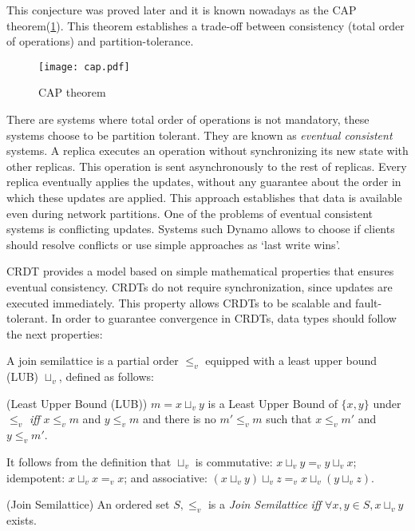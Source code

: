 This conjecture was proved\cite{capproof} later and it is known nowadays as the CAP
theorem(\ref{fig:cap}). This theorem establishes a trade-off between consistency (total order
of operations) and partition-tolerance.

\begin{figure}[!h]
  \centering
  \texttt{[image: cap.pdf]}
  \caption{CAP theorem}
  \label{fig:cap}
\end{figure}

There are systems where total order of operations is not mandatory, these systems
choose to be partition tolerant. They are known as \textit{eventual consistent}
systems. A replica executes an operation without synchronizing its new state with
other replicas. This operation is sent asynchronously to the rest of replicas.
Every replica eventually applies the updates, without any guarantee about the
order in which these updates are applied. This approach establishes that data is
available even during network partitions. One of the problems of eventual
consistent systems is conflicting updates. Systems such Dynamo\cite{dynamo}
allows to choose if clients should resolve conflicts or use simple approaches as
`last write wins'.

\acf{CRDT} provides a model based on simple mathematical properties that ensures
eventual consistency. \acs{CRDT}s do not require synchronization, since updates
are executed immediately. This property allows \acs{CRDT}s to be scalable and
fault-tolerant. In order to guarantee convergence in \acs{CRDT}s, data types
should follow the next properties:

A join semilattice\cite{book:lattices} is a partial order $\leq_{v}$ equipped with a
least upper bound (LUB) $\sqcup_v$, defined as follows:

\begin{definition}{(Least Upper Bound (LUB))}
  $m = x \sqcup_v y$ is a Least Upper Bound of $\{x, y\}$ under $\leq_{v}$ \textit{iff}
  $x\leq_{v}m$ and $y\leq_{v}m$ and there is no $m'\leq_{v}m$ such that $x\leq_{v}m'$ and $y\leq_{v}m'$.
\end{definition}

It follows from the definition that $\sqcup_v$ is commutative: $x \sqcup_v y =_v y \sqcup_v x$; idempotent:
$x \sqcup_v x =_v x$; and associative: $(x \sqcup_v y) \sqcup_v z =_v x \sqcup_v (y \sqcup_v z)$.


\begin{definition}{(Join Semilattice)}
  An ordered set ${S, \leq_v}$ is a \textit{Join Semilattice} \textit{iff}
  $\forall x, y \in S, x \sqcup_v y$ exists.
\end{definition}

